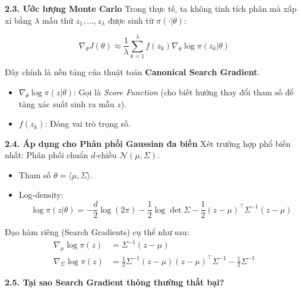 \documentclass[10pt,xcolor=dvipsnames]{beamer}
\begin{document}
\begin{frame}{\textbf{2.3. Ước lượng Monte Carlo}}
	Trong thực tế, ta không tính tích phân mà xấp xỉ bằng $\lambda$ mẫu thử $z_1, \dots, z_\lambda$ được sinh từ $\pi(\cdot|\theta)$:
	
	\begin{equation}
		\nabla_\theta J(\theta) \approx \frac{1}{\lambda} \sum_{k=1}^{\lambda} f(z_k) \nabla_\theta \log \pi(z_k | \theta)
	\end{equation}
	
	Đây chính là nền tảng của thuật toán \textbf{Canonical Search Gradient}.
	\begin{itemize}
		\item $\nabla_\theta \log \pi(z|\theta)$: Gọi là \textit{Score Function} (cho biết hướng thay đổi tham số để tăng xác suất sinh ra mẫu $z$).
		\item $f(z_k)$: Đóng vai trò trọng số.
	\end{itemize}
\end{frame}

\begin{frame}{\textbf{2.4. Áp dụng cho Phân phối Gaussian đa biến}}
	Xét trường hợp phổ biến nhất: Phân phối chuẩn $d$-chiều $\mathcal{N}(\mu, \Sigma)$.
	\begin{itemize}
		\item Tham số $\theta = \langle \mu, \Sigma \rangle$.
		\item Log-density:
		\[ \log \pi(z|\theta) = -\frac{d}{2}\log(2\pi) - \frac{1}{2}\log \det \Sigma - \frac{1}{2}(z-\mu)^\top \Sigma^{-1} (z-\mu) \]
	\end{itemize}
	
	Đạo hàm riêng (Search Gradients) cụ thể như sau:
	\begin{align}
		\nabla_\mu \log \pi(z) &= \Sigma^{-1}(z - \mu) \\
		\nabla_\Sigma \log \pi(z) &= \frac{1}{2}\Sigma^{-1}(z-\mu)(z-\mu)^\top \Sigma^{-1} - \frac{1}{2}\Sigma^{-1}
	\end{align}
\end{frame}

\begin{frame}{\textbf{2.5. Tại sao Search Gradient thông thường thất bại?}}
\end{frame}
\end{document}
